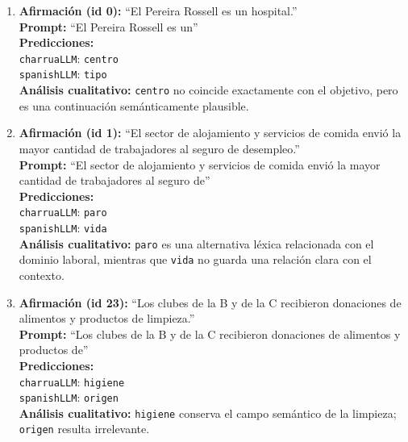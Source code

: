 \documentclass[11pt,a4paper]{article}
\newcommand{\charrua}{\texttt{charruaLLM}}
\newcommand{\spanishmodel}{\texttt{spanishLLM}}
\newcommand{\code}[1]{\texttt{#1}}
\begin{document}
\begin{enumerate}[leftmargin=*, itemsep=0.9em]
    \item \textbf{Afirmación (id 0):} ``El Pereira Rossell es un hospital.''\\
          \textbf{Prompt:} ``El Pereira Rossell es un''\\
          \textbf{Predicciones:}\\
          \hspace*{1em}\charrua{}: \code{centro}\\
          \hspace*{1em}\spanishmodel{}: \code{tipo}\\
          \textbf{Análisis cualitativo:} \code{centro} no coincide exactamente
          con el objetivo, pero es una continuación semánticamente plausible.

    \item \textbf{Afirmación (id 1):} ``El sector de alojamiento y servicios de
          comida envió la mayor cantidad de trabajadores al seguro de desempleo.''\\
          \textbf{Prompt:} ``El sector de alojamiento y servicios de comida envió
          la mayor cantidad de trabajadores al seguro de''\\
          \textbf{Predicciones:}\\
          \hspace*{1em}\charrua{}: \code{paro}\\
          \hspace*{1em}\spanishmodel{}: \code{vida}\\
          \textbf{Análisis cualitativo:} \code{paro} es una alternativa léxica
          relacionada con el dominio laboral, mientras que \code{vida} no guarda
          una relación clara con el contexto.

    \item \textbf{Afirmación (id 23):} ``Los clubes de la B y de la C recibieron
          donaciones de alimentos y productos de limpieza.''\\
          \textbf{Prompt:} ``Los clubes de la B y de la C recibieron donaciones de
          alimentos y productos de''\\
          \textbf{Predicciones:}\\
          \hspace*{1em}\charrua{}: \code{higiene}\\
          \hspace*{1em}\spanishmodel{}: \code{origen}\\
          \textbf{Análisis cualitativo:} \code{higiene} conserva el campo
          semántico de la limpieza; \code{origen} resulta irrelevante.


\end{enumerate}
\end{document}

